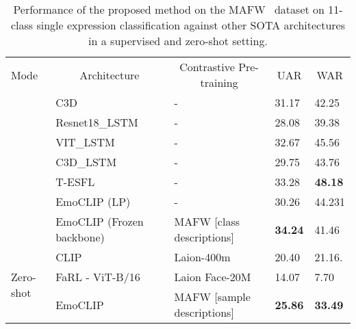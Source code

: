\documentclass[10pt,twocolumn,letterpaper]{article}
\begin{document}
\begin{table*}[h]
\centering
\begin{tabular}{lll||ll}
Mode                        & \multicolumn{1}{c}{Architecture} & \multicolumn{1}{c||}{Contrastive Pre-training} & \multicolumn{1}{c}{UAR} & \multicolumn{1}{c}{WAR}  \\ 
\hhline{===::==}
\multirow{6}{*}{Supervised} & C3D~\cite{liu_mafw_2022}                              & -                                              & 31.17                   & 42.25                    \\
                            & Resnet18\_LSTM~\cite{liu_mafw_2022}                   & -                                              & 28.08                   & 39.38                    \\
                            & VIT\_LSTM~\cite{liu_mafw_2022}                        & -                                              & 32.67                   & 45.56           \\
                            & C3D\_LSTM~\cite{liu_mafw_2022}                        & -                                              & 29.75                   & 43.76                    \\
                            & T-ESFL~\cite{liu_mafw_2022} & - & 33.28 & \textbf{48.18} \\
                            & EmoCLIP (LP)                & - &           30.26     &       44.231     \\
                            & EmoCLIP (Frozen backbone)           & MAFW [class descriptions]                         & \textbf{34.24}          & 41.46                    \\ 
\hline
\multirow{4}{*}{Zero-shot}  & CLIP~\cite{radford_CLIP_2021}                            & Laion-400m                                     & 20.40                    & 21.16.                       \\
                            & FaRL - ViT-B/16~\cite{zheng_FARL_2022}                            & Laion Face-20M        & 14.07   & 7.70                    \\
                            & EmoCLIP                             & MAFW [sample descriptions]                     & \textbf{25.86}          & \textbf{33.49}          
\end{tabular}
\caption{Performance of the proposed method on the MAFW~\cite{liu_mafw_2022} dataset on 11-class single expression classification against other SOTA architectures in a supervised and zero-shot setting.}
\label{tbl:mafw_zero}
\end{table*}
\end{document}
